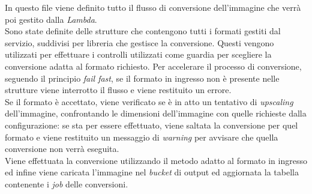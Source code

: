 In questo file viene definito tutto il flusso di conversione dell'immagine che
verrà poi gestito dalla \emph{Lambda}.\\
Sono state definite delle strutture che contengono tutti i formati gestiti dal
servizio, suddivisi per libreria che gestisce la conversione. Questi vengono
utilizzati per effettuare i controlli utilizzati come guardia per scegliere la
conversione adatta al formato richiesto. Per accelerare il processo di
conversione, seguendo il principio \emph{fail fast}, se il formato in ingresso
non è presente nelle strutture viene interrotto il flusso e viene restituito un
errore.\\
Se il formato è accettato, viene verificato se è in atto un tentativo di
\emph{upscaling} dell'immagine, confrontando le dimensioni dell'immagine con
quelle richieste dalla configurazione: se sta per essere effettuato, viene
saltata la conversione per quel formato e viene restituito un messaggio di
\emph{warning} per avvisare che quella conversione non verrà eseguita.\\
Viene effettuata la conversione utilizzando il metodo adatto al formato in
ingresso ed infine viene caricata l'immagine nel \emph{bucket} di output ed
aggiornata la tabella contenente i \emph{job} delle conversioni.


